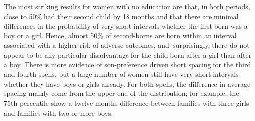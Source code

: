 \documentclass[12pt,letterpaper]{article}
\begin{document}
The most striking results for women with no education are that, in both periods, close to 
50\% had their second child by 18 months and that there are minimal differences in the 
probability of very short intervals whether the first-born was a boy or a girl.
Hence, almost 50\% of second-borns are born within an interval associated with a higher 
risk of adverse outcomes, and, surprisingly, there do not appear to be any particular 
disadvantage for the child born after a girl than after a boy.
There is more evidence of son-preference driven short spacing for the third and fourth
spells, but a large number of women still have very short intervals whether they have boys 
or girls already.
For both spells, the difference in average spacing mainly come from the upper end of the
distribution; for example, the 75th percentile show a twelve months difference between 
families with three girls and families with two or more boys.
\end{document}
